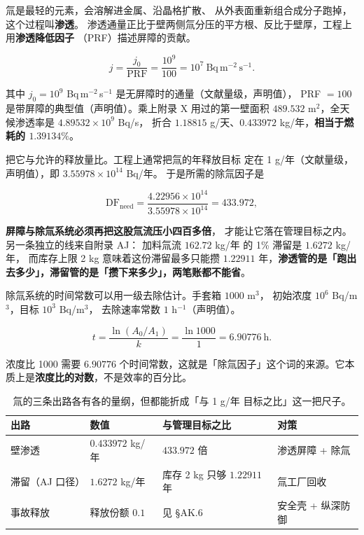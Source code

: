 氚是最轻的元素，会溶解进金属、沿晶格扩散、
从外表面重新组合成分子跑掉，这个过程叫\textbf{渗透}。
渗透通量正比于壁两侧氚分压的平方根、反比于壁厚，工程上用\textbf{渗透降低因子}
（PRF）描述屏障的贡献。

\begin{equation}
j=\frac{j_0}{\mathrm{PRF}}
=\frac{10^{9}}{100}=10^{7}\ \mathrm{Bq\,m^{-2}\,s^{-1}}.
\label{eq:app-ak-perm}
\end{equation}

其中 $j_0=10^{9}$ Bq\,m$^{-2}$\,s$^{-1}$ 是无屏障时的通量（文献量级，声明值），
PRF $=100$ 是带屏障的典型值（声明值）。乘上附录 X 用过的第一壁面积
$489.532$ m$^{2}$，全天候渗透率是 $4.89532\times10^{9}$ Bq/s，
折合 $1.18815$ g/天、$0.433972$ kg/年，\textbf{相当于燃耗的 $1.39134\%$}。

把它与允许的释放量比。工程上通常把氚的年释放目标
定在 1 g/年（文献量级，声明值），即 $3.55978\times10^{14}$ Bq/年。
于是所需的除氚因子是

\begin{equation}
\mathrm{DF_{need}}=\frac{4.22956\times10^{14}}{3.55978\times10^{14}}=433.972,
\label{eq:app-ak-df}
\end{equation}

\textbf{屏障与除氚系统必须再把这股氚流压小四百多倍}，
才能让它落在管理目标之内。另一条独立的线来自附录 AJ：
加料氚流 $162.72$ kg/年 的 1\% 滞留是 $1.6272$ kg/年，
而库存上限 2 kg 意味着这份滞留最多只能攒 $1.22911$ 年，\textbf{渗透管的是「跑出去多少」，滞留管的是「攒下来多少」，两笔账都不能省}。

除氚系统的时间常数可以用一级去除估计。手套箱 $1000$ m$^{3}$，
初始浓度 $10^{6}$ Bq/m$^{3}$，目标 $10^{3}$ Bq/m$^{3}$，
去除速率常数 $1$ h$^{-1}$（声明值）。

\begin{equation}
t=\frac{\ln(A_0/A_1)}{k}=\frac{\ln 1000}{1}=6.90776\ \mathrm{h}.
\label{eq:app-ak-clean}
\end{equation}

浓度比 1000 需要 $6.90776$ 个时间常数，这就是「除氚因子」这个词的来源。它本质上是\textbf{浓度比的对数}，不是效率的百分比。

\begin{table}[htbp]
\centering
\small
\caption{氚的三条出路各有各的量纲，但都能折成「与 1 g/年 目标之比」这一把尺子。}
\label{tab:app-ak-containment}
\begin{tabular}{p{2.9cm}p{3.5cm}p{3.2cm}p{4.1cm}}
\toprule
出路 & 数值 & 与管理目标之比 & 对策 \\
\midrule
壁渗透 & $0.433972$ kg/年 & $433.972$ 倍 & 渗透屏障 + 除氚 \\
滞留（AJ 口径） & $1.6272$ kg/年 & 库存 2 kg 只够 $1.22911$ 年 & 氚工厂回收 \\
事故释放 & 释放份额 $0.1$ & 见 \S AK.6 & 安全壳 + 纵深防御 \\
\bottomrule
\end{tabular}

\end{table}

